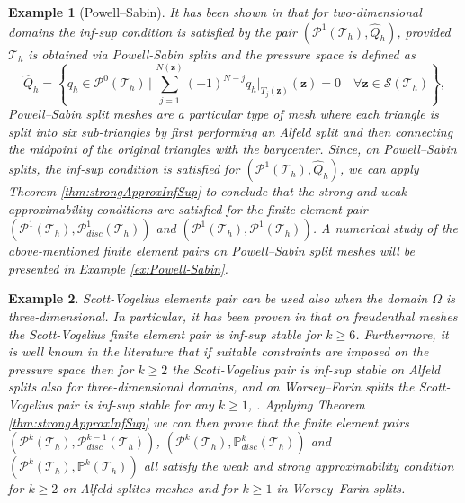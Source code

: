 \documentclass[USenglish]{article}
\theoremstyle{dgthm}
\theoremstyle{dgdef}
\newtheorem{example}{Example}
\let\vec\bm
\begin{document}
\begin{example}[Powell--Sabin]
  It has been shown in \cite{GuzmanLischkeNeilan, FabienGuzmanNeilanZytoon} that for two-dimensional domains the inf-sup condition is satisfied by the pair $\left(\vec{\mathcal{P}}^1(\mathcal{T}_h),\hat{Q}_h\right)$, provided $\mathcal{T}_h$ is obtained via Powell-Sabin splits and the pressure space is defined as
  \begin{equation}
    \hat{Q}_h = \left\{q_h\in \mathcal{P}^{0}(\mathcal{T}_h)\,|\, \sum_{j=1}^{N(\vec{z})} (-1)^{N-j} q_h\big|_{T_j(\vec{z})}(\vec{z}) = 0 \quad \forall \vec{z}\in \mathcal{S}(\mathcal{T}_h)\right\},
  \end{equation}
  Powell--Sabin split meshes are a particular type of mesh where each triangle is split into six sub-triangles by first performing an Alfeld split and then connecting the midpoint of the original triangles with the barycenter.
  Since, on Powell--Sabin splits, the inf-sup condition is satisfied for $\left(\vec{\mathcal{P}}^1(\mathcal{T}_h),\hat{Q}_h\right)$, we can apply Theorem \ref{thm:strongApproxInfSup} to conclude that the strong and weak approximability conditions are satisfied for the finite element pair $\left(\vec{\mathcal{P}}^1(\mathcal{T}_h),\mathcal{P}^1_{disc}(\mathcal{T}_h)\right)$ and $\left(\vec{\mathcal{P}}^1(\mathcal{T}_h),\mathcal{P}^1(\mathcal{T}_h)\right)$.
  A numerical study of the above-mentioned finite element pairs on Powell--Sabin split meshes will be presented in Example \ref{ex:Powell-Sabin}.
\end{example}
\begin{example}
  Scott-Vogelius elements pair can be used also when the domain $\Omega$ is three-dimensional. In particular, it has been proven in \cite{Zhang} that on freudenthal meshes the Scott-Vogelius finite element pair is inf-sup stable for $k\geq 6$.
  Furthermore, it is well known in the literature that if suitable constraints are imposed on the pressure space then for $k\geq 2$ the Scott-Vogelius pair is inf-sup stable on Alfeld splits also for three-dimensional domains, and on Worsey--Farin splits the Scott-Vogelius pair is inf-sup stable for any $k\geq 1$, \cite{FuGuzmanNeilan, FabienGuzmanNeilanZytoon}.
  Applying Theorem \ref{thm:strongApproxInfSup} we can then prove that the finite element pairs $\left(\vec{\mathcal{P}}^k(\mathcal{T}_h), \mathcal{P}^{k-1}_{disc}(\mathcal{T}_h)\right)$, $\left(\vec{\mathcal{P}}^k(\mathcal{T}_h), \mathbb{P}^{k}_{disc}(\mathcal{T}_h)\right)$ and $\left(\vec{\mathcal{P}}^k(\mathcal{T}_h), \mathbb{P}^{k}(\mathcal{T}_h)\right)$ all satisfy the weak and strong approximability condition for $k\geq 2$ on Alfeld splites meshes and for $k\geq1$ in Worsey--Farin splits.
\end{example}
\end{document}
